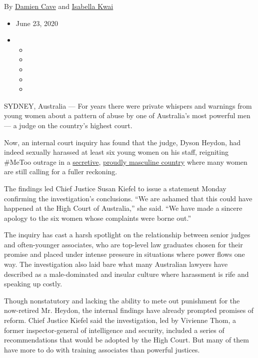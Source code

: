 By \href{https://www.nytimes3xbfgragh.onion/by/damien-cave}{Damien Cave}
and \href{https://www.nytimes3xbfgragh.onion/by/isabella-kwai}{Isabella
Kwai}

\begin{itemize}
\item
  June 23, 2020
\item
  \begin{itemize}
  \item
  \item
  \item
  \item
  \item
  \end{itemize}
\end{itemize}

SYDNEY, Australia --- For years there were private whispers and warnings
from young women about a pattern of abuse by one of Australia's most
powerful men --- a judge on the country's highest court.

Now, an internal court inquiry has found that the judge, Dyson Heydon,
had indeed sexually harassed at least six young women on his staff,
reigniting \#MeToo outrage in a
\href{https://www.nytimes3xbfgragh.onion/2019/06/05/world/australia/journalist-raids.html}{secretive},
\href{https://www.nytimes3xbfgragh.onion/2019/02/26/world/australia/australia-sex-abuse-secrecy.html}{proudly
masculine country} where many women are still calling for a fuller
reckoning.

The findings led Chief Justice Susan Kiefel to issue a statement Monday
confirming the investigation's conclusions. ``We are ashamed that this
could have happened at the High Court of Australia,'' she said. ``We
have made a sincere apology to the six women whose complaints were borne
out.''

The inquiry has cast a harsh spotlight on the relationship between
senior judges and often-younger associates, who are top-level law
graduates chosen for their promise and placed under intense pressure in
situations where power flows one way. The investigation also laid bare
what many Australian lawyers have described as a male-dominated and
insular culture where harassment is rife and speaking up costly.

Though nonstatutory and lacking the ability to mete out punishment for
the now-retired Mr. Heydon, the internal findings have already prompted
promises of reform. Chief Justice Kiefel said the investigation, led by
Vivienne Thom, a former inspector-general of intelligence and security,
included a series of recommendations that would be adopted by the High
Court. But many of them have more to do with training associates than
powerful justices.

